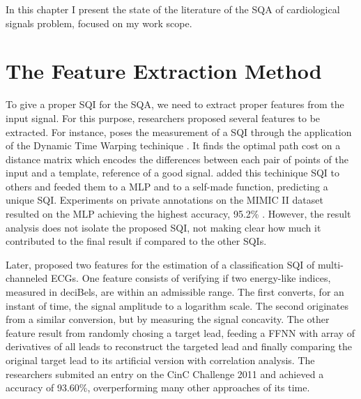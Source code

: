 

In this chapter I present the state of the literature of the \acrlong{SQA} of cardiological signals problem, focused on my work scope.

\section{The Feature Extraction Method}
\label{sec:feature}

To give a proper \acrshort{SQI} for the \acrshort{SQA}, we need to extract proper features from the input signal. For this purpose, researchers proposed several features to be extracted. For instance, \citeauthor{review-1} poses the measurement of a \acrshort{SQI} through the application of the Dynamic Time Warping techinique \cite{review-1}. It finds the optimal path cost on a distance matrix which encodes the differences between each pair of points of the input and a template, reference of a good signal. \citeauthor{review-1} added this techinique \acrshort{SQI} to others and feeded them to a \acrshort{MLP} and to a self-made function, predicting a unique \acrshort{SQI}. Experiments on private annotations on the MIMIC II dataset resulted on the \acrshort{MLP} achieving the highest accuracy, 95.2\% \cite{review-1}. However, the result analysis does not isolate the proposed \acrshort{SQI}, not making clear how much it contributed to the final result if compared to the other \acrshort{SQI}s.      

Later, \citeauthor{review-2} proposed two features for the estimation of a classification \acrshort{SQI} of multi-channeled \acrshort{ECG}s. One feature consists of verifying if two energy-like indices, measured in deciBels, are within an admissible range. The first converts, for an instant of time, the signal amplitude to a logarithm scale. The second originates from a similar conversion, but by measuring the signal concavity. The other feature result from randomly chosing a target lead, feeding a \acrshort{FFNN} with array of derivatives of all leads to reconstruct the targeted lead and finally comparing the original target lead to its artificial version with correlation analysis. The researchers submited an entry on the CinC Challenge 2011 and achieved a accuracy of 93.60\%, overperforming many other approaches of its time.  

